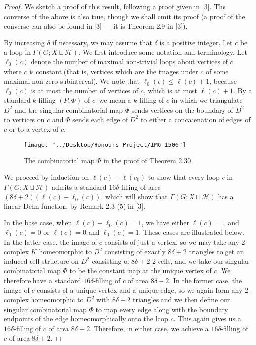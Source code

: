 \documentclass[12pt]{article}
\newcommand{\vs}{\vskip10pt}
\begin{document}
	\begin{proof}
		
		We sketch a proof of this result, following a proof given in [3]. The converse of the above is also true, though we shall omit its proof (a proof of the converse can also be found in [3] --- it is Theorem 2.9 in [3]). 
		
		\vs 
		
		By increasing $\delta$ if necessary, we may assume that $\delta$ is a positive integer. Let $c$ be a loop in $\Gamma(G; X \sqcup \mathcal{H})$. We first introduce some notation and terminology. Let $\ell_0(c)$ denote the number of maximal non-trivial loops about vertices of $c$ where $c$ is constant (that is, vertices which are the images under $c$ of some maximal non-zero subinterval). We note that $\ell_0(c) \leq \ell(c) + 1$, because $\ell_0(c)$ is at most the number of vertices of $c$, which is at most $\ell(c) + 1$. By a standard $k$-filling $(P, \Phi)$ of $c$, we mean a $k$-filling of $c$ in which we triangulate $D^2$ and the singular combinatorial map $\Phi$ sends vertices on the boundary of $D^2$ to vertices on $c$ and $\Phi$ sends each edge of $D^2$ to either a concatenation of edges of $c$ or to a vertex of $c$. 
		
	
\begin{figure} [H]
	\centering
	\texttt{[image: "../Desktop/Honours Project/IMG\_1506"]}
	\caption{ The combinatorial map $\Phi$ in the proof of Theorem 2.30}
	\label{fig:img1506}
\end{figure}
		
		\vs 
		
		We proceed by induction on $\ell(c) + \ell(c_0)$ to show that every loop $c$ in $\Gamma(G; X \sqcup \mathcal{H})$ admits a standard $16\delta$-filling of area $(8 \delta + 2)(\ell(c) + \ell_0(c))$, which will show that $\Gamma(G; X \sqcup \mathcal{H})$ has a linear Dehn function, by Remark 2.3 (5) in [3]. 
		
		\vs 
		
		In the base case, when $\ell(c) + \ell_0(c) = 1$, we have either $\ell(c) = 1$ and $\ell_0(c) = 0$ or $\ell(c) = 0$ and $\ell_0(c) = 1$. These cases are illustrated below. In the latter case, the image of $c$ consists of just a vertex, so we may take any 2-complex $K$ homeomorphic to $D^2$ consisting of exactly $8 \delta + 2$ triangles to get an induced cell structure on $D^2$ consisting of $8 \delta + 2$ 2-cells, and we take our singular combinatorial map $\Phi$ to be the constant map at the unique vertex of $c$. We therefore have a standard $16 \delta$-filling of $c$ of area $8 \delta + 2$. In the former case, the image of $c$ consists of a unique vertex and a unique edge, so we again form any 2-complex homeomorphic to $D^2$ with $8 \delta + 2$ triangles and we then define our singular combinatorial map $\Phi$ to map every edge along with the boundary endpoints of the edge homeomorphically onto the loop $c$. This again gives us a $16 \delta$-filling of $c$ of area $8 \delta + 2$. Therefore, in either case, we achieve a $16 \delta$-filling of $c$ of area $8 \delta + 2$. 
		

\end{proof}
\end{document}

